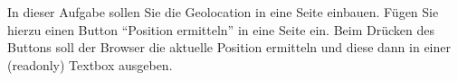 %
\par In dieser Aufgabe sollen Sie die Geolocation in eine Seite einbauen. Fügen
Sie hierzu einen Button ``Position ermitteln'' in eine Seite ein. Beim Drücken
des Buttons soll der Browser die aktuelle Position ermitteln und diese dann in
einer (readonly) Textbox ausgeben.